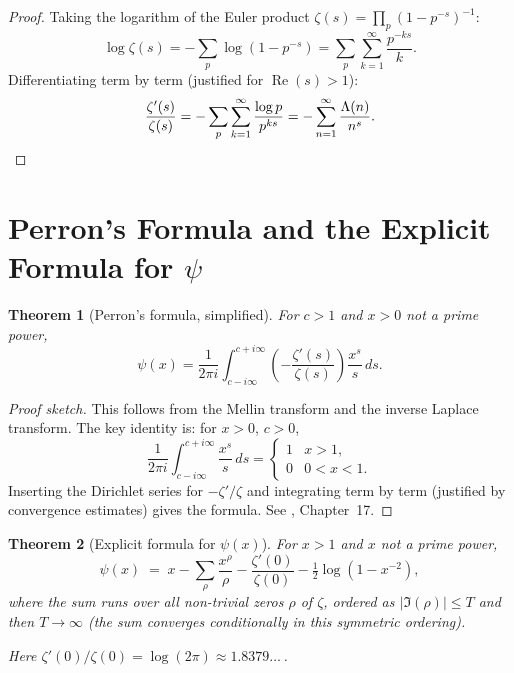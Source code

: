 \documentclass[12pt,a4paper]{amsart}
\newtheorem{theorem}{Theorem}[section]
\theoremstyle{definition}
\DeclareMathOperator{\Re}{Re}
\begin{document}
\begin{proof}
Taking the logarithm of the Euler product $\zeta(s) = \prod_p (1-p^{-s})^{-1}$:
\[
  \log\zeta(s) = -\sum_p \log(1 - p^{-s}) = \sum_p \sum_{k=1}^{\infty} \frac{p^{-ks}}{k}.
\]
Differentiating term by term (justified for $\Re(s) > 1$):
\[
  \frac{\zeta'(s)}{\zeta(s)} = -\sum_p \sum_{k=1}^{\infty} \frac{\log p}{p^{ks}}
  = -\sum_{n=1}^{\infty} \frac{\Lambda(n)}{n^s}. \qedhere
\]
\end{proof}

\section{Perron's Formula and the Explicit Formula for \texorpdfstring{$\psi$}{psi}}

\begin{theorem}[Perron's formula, simplified]
\label{thm:perron}
For $c > 1$ and $x > 0$ not a prime power,
\[
  \psi(x) = \frac{1}{2\pi i} \int_{c-i\infty}^{c+i\infty}
  \left(-\frac{\zeta'(s)}{\zeta(s)}\right) \frac{x^s}{s}\,ds.
\]
\end{theorem}

\begin{proof}[Proof sketch]
This follows from the Mellin transform and the inverse Laplace transform.
The key identity is: for $x > 0$, $c > 0$,
\[
  \frac{1}{2\pi i} \int_{c-i\infty}^{c+i\infty} \frac{x^s}{s}\,ds
  = \begin{cases} 1 & x > 1, \\ 0 & 0 < x < 1. \end{cases}
\]
Inserting the Dirichlet series for $-\zeta'/\zeta$ and integrating term by term
(justified by convergence estimates) gives the formula.
See \cite{Davenport2000}, Chapter~17.
\end{proof}

\begin{theorem}[Explicit formula for $\psi(x)$]
\label{thm:explicit_psi}
For $x > 1$ and $x$ not a prime power,
\begin{equation}
  \label{eq:explicit_psi}
  \psi(x) \;=\; x - \sum_\rho \frac{x^\rho}{\rho}
  - \frac{\zeta'(0)}{\zeta(0)} - \tfrac{1}{2}\log(1 - x^{-2}),
\end{equation}
where the sum runs over all non-trivial zeros $\rho$ of $\zeta$,
ordered as $|\Im(\rho)| \le T$ and then $T \to \infty$
(the sum converges conditionally in this symmetric ordering).

Here $\zeta'(0)/\zeta(0) = \log(2\pi) \approx 1.8379\ldots$\,.
\end{theorem}
\end{document}
